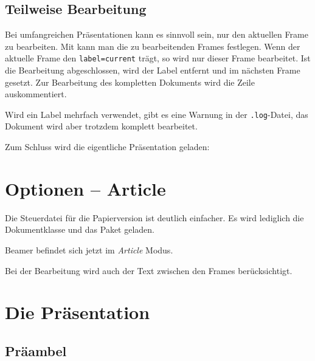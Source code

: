 \subsection{Teilweise Bearbeitung}

Bei umfangreichen Präsentationen kann es sinnvoll sein, nur den aktuellen
Frame zu bearbeiten.  Mit  kann man die zu
bearbeitenden Frames festlegen.  Wenn der aktuelle Frame den
\texttt{label=current} trägt, so wird nur dieser Frame bearbeitet.  Ist die
Bearbeitung abgeschlossen, wird der Label entfernt und im nächsten Frame
gesetzt.  Zur Bearbeitung des kompletten Dokuments wird die Zeile
auskommentiert.

Wird ein Label mehrfach verwendet, gibt es eine Warnung in der
\texttt{.log}-Datei, das Dokument wird aber trotzdem komplett bearbeitet.

\begin{lfgwcode}{}
\end{lfgwcode}

Zum Schluss wird die eigentliche Präsentation geladen:

\begin{lfgwcode}{}

\end{lfgwcode}

\section{Optionen -- Article}

Die Steuerdatei für die Papierversion ist deutlich einfacher. Es wird
lediglich die Dokumentklasse und das Paket  geladen.

Beamer befindet sich jetzt im \textit{Article} Modus. 

Bei der Bearbeitung wird auch der Text zwischen den Frames berücksichtigt.


\section{Die Präsentation}

\subsection{Präambel}

